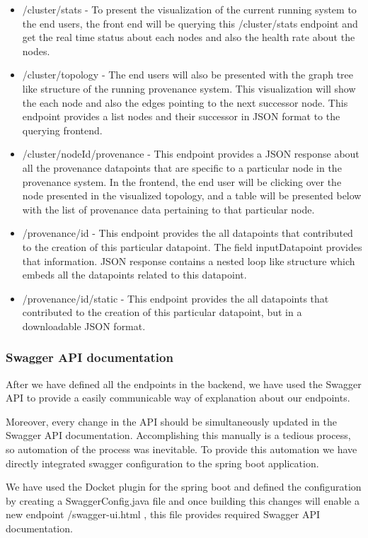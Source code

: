 \begin{itemize}
	\item /cluster/stats - To present the visualization of the current running system to the end users, the front end will be querying this /cluster/stats endpoint and get the real time status about each nodes and also the health rate about the nodes. 

	\item /cluster/topology - The end users will also be presented with the graph tree like structure of the running provenance system. This visualization will show the each node and also the edges pointing to the next successor node. This endpoint provides a list nodes and their successor in JSON format to the querying frontend. 

	\item /cluster/{nodeId}/provenance -  This endpoint provides a JSON response about all the provenance datapoints that are specific to a particular node in the provenance system. In the frontend, the end user will be clicking over the node presented in the visualized topology, and a table will be presented below with the list of provenance data pertaining to that particular node.

	\item/provenance/{id} - This endpoint provides the all datapoints that contributed to the creation of this particular datapoint. The field inputDatapoint provides that information. JSON response contains a nested loop like structure which embeds all the datapoints related to this datapoint. 

	\item /provenance/{id}/static - This endpoint provides the all datapoints that contributed to the creation of this particular datapoint, but in a downloadable JSON format.

\end{itemize}

\subsubsection{Swagger API documentation}

After we have defined all the endpoints in the backend, we have used the Swagger API to provide a easily communicable way of explanation about our endpoints. 

Moreover, every change in the API should be simultaneously updated in the Swagger API documentation. Accomplishing this manually is a tedious process, so automation of the process was inevitable. To provide this automation we have directly integrated swagger configuration to the spring boot application.

We have used the Docket plugin for the spring boot and defined the configuration by creating a SwaggerConfig.java file and once building this changes will enable a new endpoint /swagger-ui.html , this file provides required Swagger API documentation.